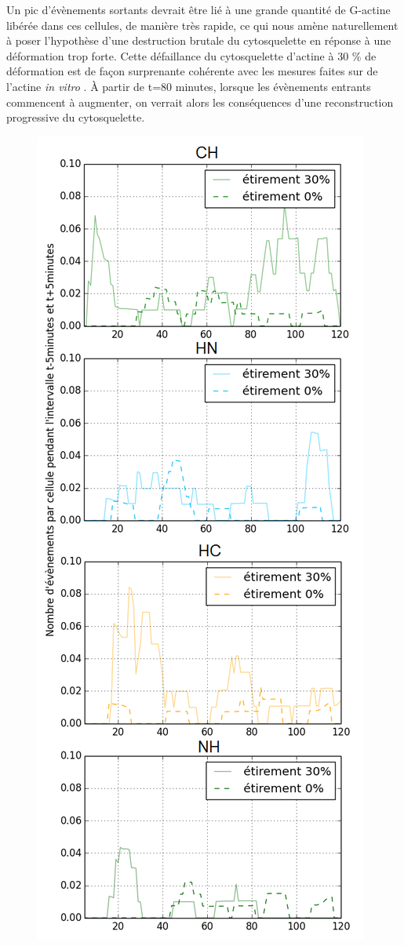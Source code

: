 Un pic d'évènements sortants devrait être lié à une grande quantité de G-actine libérée dans ces cellules, de manière très rapide, ce qui nous amène naturellement à poser l'hypothèse d'une destruction brutale du cytosquelette en réponse à une déformation trop forte. Cette défaillance du cytosquelette d'actine à 30 \% de déformation est de façon surprenante cohérente avec les mesures faites sur de l'actine \textit{in vitro} \cite{janmey_mechanical_1994}. 
À partir de t=80 minutes, lorsque les évènements entrants commencent à augmenter, on verrait alors les conséquences d'une reconstruction progressive du cytosquelette. 

 
\begin{figure}
\includegraphics[scale=0.5]{Figures/Etirement30_vs_0_translocations.png}

\end{figure}
